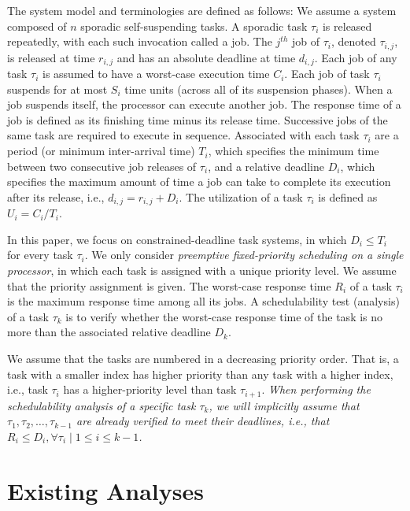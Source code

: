 \documentclass[10pt,conference,preprint]{IEEEtran}
\begin{document}
The system model and terminologies are defined as follows: We assume a system composed of $n$ sporadic self-suspending tasks. A sporadic task $\tau_i$ is released repeatedly, with each such invocation called a
job. The $j^{th}$ job of $\tau_i$, denoted $\tau_{i,j}$, is released
at time $r_{i,j}$ and has an absolute deadline at time $d_{i,j}$. Each
job of any task $\tau_i$ is assumed to have a worst-case execution time $C_i$. Each job of task $\tau_i$ 
suspends for at most $S_i$ time units (across all of its suspension phases). When a job suspends itself, 
the processor can execute another job. 
The response time
of a job is defined as its finishing time minus its release
time. Successive jobs of the same task are required to execute in
sequence. Associated with each task $\tau_i$ are a period (or minimum inter-arrival time) $T_i$, which
specifies the minimum time between two consecutive job releases of
$\tau_i$, and a relative deadline $D_i$, which specifies the maximum
amount of time a job can take to complete its execution after its
release, i.e., $d_{i,j}=r_{i,j}+D_i$. 
 The utilization of a task $\tau_i$ is defined as $U_i=C_i/T_i$.

In this paper, we focus on constrained-deadline task systems, in which
$D_i \leq T_i$ for every task $\tau_i$. We only consider
\emph{preemptive fixed-priority scheduling on a single processor}, in
which each task is assigned with a unique priority level. We assume
that the priority assignment is given. The worst-case response
time $R_i$ of a task $\tau_i$ is the maximum response time among all its
jobs. A schedulability test (analysis) of a task $\tau_k$
is to verify whether the worst-case response time of the task is no more than the associated relative deadline $D_k$.

We assume that the tasks are numbered in a decreasing priority order. That is, a task with a smaller index has higher priority than any task with a higher index, i.e., task $\tau_i$ has a higher-priority level than task $\tau_{i+1}$. \emph{When performing the schedulability analysis of a specific task $\tau_k$, we will implicitly assume that $\tau_1, \tau_2, \ldots, \tau_{k-1}$ are already verified to meet their deadlines, i.e., that $R_i \leq D_i, \forall \tau_i \mid 1 \leq i \leq k-1$. }

\section{Existing Analyses}
\label{sec:existing-analyses}
\end{document}
